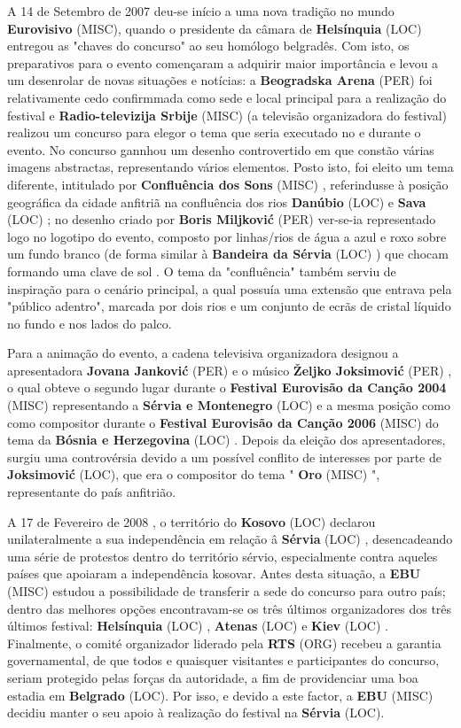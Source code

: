 \documentclass[12pt,a4paper]{article}
\begin{document}
A 14 de Setembro de 2007 deu-se início a uma nova tradição no mundo \textbf{Eurovisivo} (MISC), quando o presidente da câmara de \textbf{Helsínquia} (LOC) entregou as "chaves do concurso" ao seu homólogo belgradês. Com isto, os preparativos para o evento començaram a adquirir maior importância e levou a um desenrolar de novas situações e notícias: a \textbf{Beogradska Arena} (PER) foi relativamente cedo confirmmada como sede e local principal para a realização do festival e \textbf{Radio-televizija Srbije} (MISC) (a televisão organizadora do festival) realizou um concurso para elegor o tema que seria executado no e durante o evento. No concurso gannhou um desenho controvertido em que constão várias imagens abstractas, representando vários elementos. Posto isto, foi eleito um tema diferente, intitulado por \textbf{Confluência dos Sons} (MISC) , referindusse à posição geográfica da cidade anfitriã na confluência dos rios \textbf{Danúbio} (LOC) e \textbf{Sava} (LOC) ; no desenho criado por \textbf{Boris Miljković} (PER) ver-se-ia representado logo no logotipo do evento, composto por linhas/rios de água a azul e roxo sobre um fundo branco (de forma similar à \textbf{Bandeira da Sérvia} (LOC) ) que chocam formando uma clave de sol . O tema da "confluência" também serviu de inspiração para o cenário principal, a qual possuía uma extensão que entrava pela "público adentro", marcada por dois rios e um conjunto de ecrãs de cristal líquido no fundo e nos lados do palco.

Para a animação do evento, a cadena televisiva organizadora designou a apresentadora \textbf{Jovana Janković} (PER) e o músico \textbf{Željko Joksimović} (PER) , o qual obteve o segundo lugar durante o \textbf{Festival Eurovisão da Canção 2004} (MISC) representando a \textbf{Sérvia e Montenegro} (LOC) e a mesma posição como como compositor durante o \textbf{Festival Eurovisão da Canção 2006} (MISC) do tema da \textbf{Bósnia e Herzegovina} (LOC) . Depois da eleição dos apresentadores, surgiu uma controvérsia devido a um possível conflito de interesses por parte de \textbf{Joksimović} (LOC), que era o compositor do tema " \textbf{Oro} (MISC) ", representante do país anfitrião.

A 17 de Fevereiro de 2008 , o território do \textbf{Kosovo} (LOC) declarou unilateralmente a sua independência em relação â \textbf{Sérvia} (LOC) , desencadeando uma série de protestos dentro do território sérvio, especialmente contra aqueles países que apoiaram a independência kosovar. Antes desta situação, a \textbf{EBU} (MISC) estudou a possibilidade de transferir a sede do concurso para outro país; dentro das melhores opções encontravam-se os três últimos organizadores dos três últimos festival: \textbf{Helsínquia} (LOC) , \textbf{Atenas} (LOC) e \textbf{Kiev} (LOC) . Finalmente, o comité organizador liderado pela \textbf{RTS} (ORG) recebeu a garantia governamental, de que todos e quaisquer visitantes e participantes do concurso, seriam protegido pelas forças da autoridade, a fim de providenciar uma boa estadia em \textbf{Belgrado} (LOC). Por isso, e devido a este factor, a \textbf{EBU} (MISC) decidiu manter o seu apoio à realização do festival na \textbf{Sérvia} (LOC).
\end{document}
